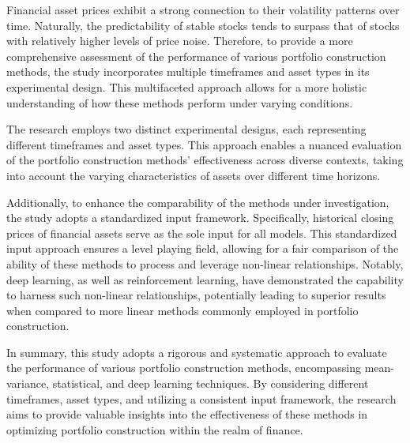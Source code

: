 Financial asset prices exhibit a strong connection to their volatility patterns over time. Naturally, the predictability of stable stocks tends to surpass that of stocks with relatively higher levels of price noise. Therefore, to provide a more comprehensive assessment of the performance of various portfolio construction methods, the study incorporates multiple timeframes and asset types in its experimental design. This multifaceted approach allows for a more holistic understanding of how these methods perform under varying conditions.

The research employs two distinct experimental designs, each representing different timeframes and asset types. This approach enables a nuanced evaluation of the portfolio construction methods' effectiveness across diverse contexts, taking into account the varying characteristics of assets over different time horizons.

Additionally, to enhance the comparability of the methods under investigation, the study adopts a standardized input framework. Specifically, historical closing prices of financial assets serve as the sole input for all models. This standardized input approach ensures a level playing field, allowing for a fair comparison of the ability of these methods to process and leverage non-linear relationships. Notably, deep learning, as well as reinforcement learning, have demonstrated the capability to harness such non-linear relationships, potentially leading to superior results when compared to more linear methods commonly employed in portfolio construction.

In summary, this study adopts a rigorous and systematic approach to evaluate the performance of various portfolio construction methods, encompassing mean-variance, statistical, and deep learning techniques. By considering different timeframes, asset types, and utilizing a consistent input framework, the research aims to provide valuable insights into the effectiveness of these methods in optimizing portfolio construction within the realm of finance.
